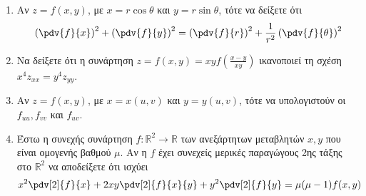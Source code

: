 \begin{enumerate}
	


 
 \item Αν $ z = f(x,y) $, με $ x=r \cos{\theta} $ και $ y = r \sin{\theta} $, τότε να δείξετε ότι
	 \[
		 \left(\pdv{f}{x}\right)^{2} + \left(\pdv{f}{y}\right)^{2} = \left(\pdv{f}{r}\right)^{2} + \frac{1}{ r^{2} }
		 \left(\pdv{f}{\theta}\right)^{2} 
	 \] 




 \item Να δείξετε ότι η συνάρτηση $ z = f(x,y) = xyf\left(\frac{ x-y }{ xy }\right) $ ικανοποιεί τη
	 σχέση $ x^{4} z_{xx} = y^{4} z_{yy} $.


 \item Αν $ z = f(x,y) $, με $ x = x(u,v) $ και $ y = y(u,v) $, τότε να υπολογιστούν οι $ f_{uu},
	 f_{vv} $ και $ f_{uv} $.



 \item Έστω η συνεχής συνάρτηση $ f : \mathbb{R}^{2} \to \mathbb{R} $ των ανεξάρτητων μεταβλητών $
	 x,y $ που είναι ομογενής βαθμού $ \mu $. Αν η $f$ έχει συνεχείς μερικές παραγώγους 2ης τάξης
	 στο $ \mathbb{R}^{2} $ να αποδείξετε ότι ισχύει 
	 \[
		 x^{2}\pdv[2]{f}{x} + 2xy\pdv[2]{f}{x}{y} + y^{2}\pdv[2]{f}{y} = \mu(\mu -1)f(x,y)
	 \] 


\end{enumerate}
